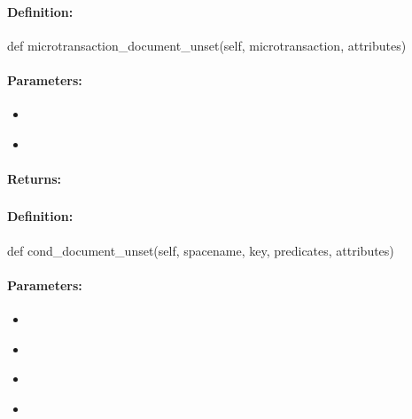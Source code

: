 \paragraph{Definition:}
\begin{pythoncode}
def microtransaction_document_unset(self, microtransaction, attributes)
\end{pythoncode}

\paragraph{Parameters:}
\begin{itemize}[noitemsep]
\item {}\\

\item {}\\

\end{itemize}

\paragraph{Returns:}


\pagebreak
\subsubsection{}
\label{api:python:cond_document_unset}


\paragraph{Definition:}
\begin{pythoncode}
def cond_document_unset(self, spacename, key, predicates, attributes)
\end{pythoncode}

\paragraph{Parameters:}
\begin{itemize}[noitemsep]
\item {}\\

\item {}\\

\item {}\\

\item {}\\

\end{itemize}

